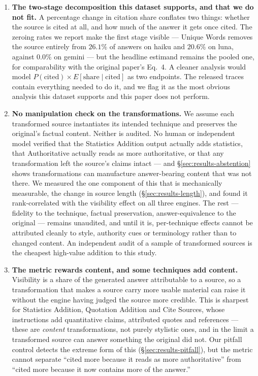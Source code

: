 \documentclass[11pt,a4paper]{article}
\begin{document}
\begin{enumerate}[leftmargin=*]
\item \textbf{The two-stage decomposition this dataset supports, and that we
  do not fit.} A percentage change in citation share conflates two things:
  whether the source is cited at all, and how much of the answer it gets
  once cited. The zeroing rates we report make the first stage visible ---
  Unique Words removes the source entirely from $26.1\%$ of answers on haiku
  and $20.6\%$ on luna, against $0.0\%$ on gemini --- but the headline
  estimand remains the pooled one, for comparability with the original
  paper's Eq.~4. A cleaner analysis would model
  $P(\text{cited}) \times E[\text{share} \mid \text{cited}]$ as two
  endpoints. The released traces contain everything needed to do it, and we
  flag it as the most obvious analysis this dataset supports and this paper
  does not perform.

\item \textbf{No manipulation check on the transformations.} We assume each
  transformed source instantiates its intended technique and preserves the
  original's factual content. Neither is audited. No human or independent
  model verified that the Statistics Addition output actually adds
  statistics, that Authoritative actually reads as more authoritative, or
  that any transformation left the source's claims intact --- and
  \S\ref{sec:results-abstention} shows transformations can manufacture
  answer-bearing content that was not there. We measured the one component
  of this that is mechanically measurable, the change in source length
  (\S\ref{sec:results-length}), and found it rank-correlated with the
  visibility effect on all three engines. The rest --- fidelity to the
  technique, factual preservation, answer-equivalence to the original ---
  remains unaudited, and until it is, per-technique effects cannot be
  attributed cleanly to style, authority cues or terminology rather than to
  changed content. An independent audit of a sample of transformed sources
  is the cheapest high-value addition to this study.

\item \textbf{The metric rewards content, and some techniques add content.}
  Visibility is a share of the generated answer attributable to a source, so
  a transformation that makes a source carry more usable material can raise
  it without the engine having judged the source more credible. This is
  sharpest for Statistics Addition, Quotation Addition and Cite Sources,
  whose instructions add quantitative claims, attributed quotes and
  references --- these are \emph{content} transformations, not purely
  stylistic ones, and in the limit a transformed source can answer something
  the original did not. Our pitfall control detects the extreme form of this
  (\S\ref{sec:results-pitfall}), but the metric cannot separate ``cited
  more because it reads as more authoritative'' from ``cited more because it
  now contains more of the answer.''


\end{enumerate}
\end{document}
